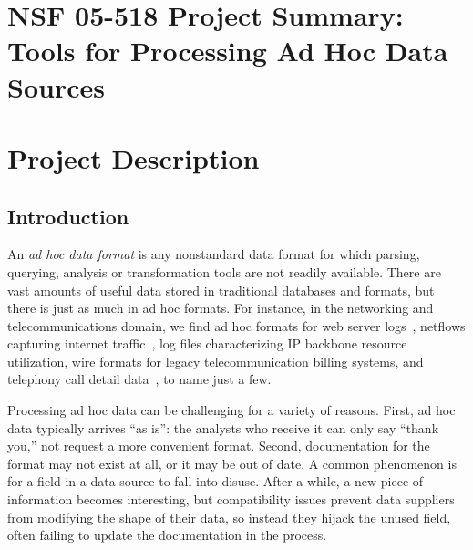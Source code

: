 \documentclass[11pt]{article}
\begin{document}
\setcounter{page}{1}
\appendix
\section{NSF 05-518 Project Summary:  Tools for Processing Ad Hoc Data Sources}

\newpage
\setcounter{page}{1}
\section{Project Description}

\subsection{Introduction}
\label{ssec:intro}

An {\em ad hoc data format} is any nonstandard data format
for which parsing, querying, analysis or transformation
tools are not readily available.
There are vast amounts of useful data 
stored in traditional databases and \xml formats, but there is just
as much in ad hoc formats.
For instance, in the networking and telecommunications
domain, we find ad hoc formats for web server logs~\cite{wpp}, 
netflows capturing internet traffic~\cite{netflow}, 
log files characterizing IP backbone resource utilization,
wire formats for legacy telecommunication billing systems, 
and telephony call detail data~\cite{hancock-toplas}, to name just a few.


Processing ad hoc data can be challenging for a variety of
reasons. First, ad hoc data typically arrives ``as is'': the analysts
who receive it can only say ``thank you,'' not request a more convenient format. 
Second, documentation for the format may not exist at all, or it may be
out of date.  A common phenomenon is for a field in a
data source to fall into disuse.  After a while, a new piece of
information becomes interesting, but compatibility issues prevent 
data suppliers from modifying the
shape of their data, so instead they hijack the unused field, often
failing to update the documentation in the process.
\end{document}
